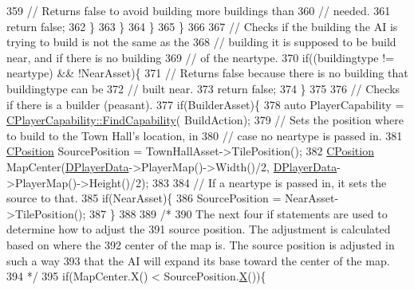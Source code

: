\begin{DoxyCode}
359                     \textcolor{comment}{// Returns false to avoid building more buildings than}
360                     \textcolor{comment}{// needed.}
361                     \textcolor{keywordflow}{return} \textcolor{keyword}{false};   
362                 \}
363             \}
364         \}
365     \}
366 
367     \textcolor{comment}{// Checks if the building the AI is trying to build is not the same as the }
368     \textcolor{comment}{// building it is supposed to be build near, and if there is no building}
369     \textcolor{comment}{// of the neartype.}
370     \textcolor{keywordflow}{if}((buildingtype != neartype) && !NearAsset)\{
371         \textcolor{comment}{// Returns false because there is no building that buildingtype can be}
372         \textcolor{comment}{// built near. }
373         \textcolor{keywordflow}{return} \textcolor{keyword}{false};    
374     \}
375 
376     \textcolor{comment}{// Checks if there is a builder (peasant).}
377     \textcolor{keywordflow}{if}(BuilderAsset)\{
378         \textcolor{keyword}{auto} PlayerCapability = \hyperlink{classCPlayerCapability_a881ba4b87385d7cfe5cb6ced2d26f226}{CPlayerCapability::FindCapability}(
      BuildAction);
379         \textcolor{comment}{// Sets the position where to build to the Town Hall's location, in }
380         \textcolor{comment}{// case no neartype is passed in.}
381         \hyperlink{classCPosition}{CPosition} SourcePosition = TownHallAsset->TilePosition();
382         \hyperlink{classCPosition}{CPosition} MapCenter(\hyperlink{classCAIPlayer_a83b5113c8f7e80df54940b647c5ee2e6}{DPlayerData}->PlayerMap()->Width()/2, 
      \hyperlink{classCAIPlayer_a83b5113c8f7e80df54940b647c5ee2e6}{DPlayerData}->PlayerMap()->Height()/2);
383         
384         \textcolor{comment}{// If a neartype is passed in, it sets the source to that.}
385         \textcolor{keywordflow}{if}(NearAsset)\{
386             SourcePosition = NearAsset->TilePosition();
387         \}
388 
389         \textcolor{comment}{/*  }
390 \textcolor{comment}{            The next four if statements are used to determine how to adjust the}
391 \textcolor{comment}{            source position. The adjustment is calculated based on where the }
392 \textcolor{comment}{            center of the map is. The source position is adjusted in such a way }
393 \textcolor{comment}{            that the AI will expand its base toward the center of the map.}
394 \textcolor{comment}{        */}
395         \textcolor{keywordflow}{if}(MapCenter.X() < SourcePosition.\hyperlink{classCPosition_a9a6b94d3b91df1492d166d9964c865fc}{X}())\{

\end{DoxyCode}
